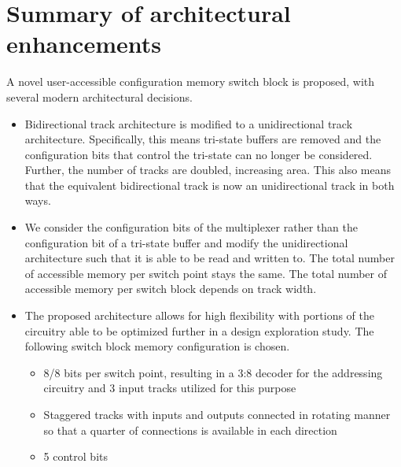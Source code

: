 
\section{Summary of architectural enhancements}
\label{arch:summary}
A novel user-accessible configuration memory switch block is proposed, with several modern architectural decisions. 


\begin{itemize}
    \item Bidirectional track architecture is modified to a unidirectional track architecture. Specifically, this means tri-state buffers are removed and the configuration bits that control the tri-state can no longer be considered. Further, the number of tracks are doubled, increasing area. This also means that the equivalent bidirectional track is now an unidirectional track in both ways. 
    \item We consider the configuration bits of the multiplexer rather than the configuration bit of a tri-state buffer and modify the unidirectional architecture such that it is able to be read and written to. The total number of accessible memory per switch point stays the same. The total number of accessible memory per switch block depends on track width.
    \item 
    
The proposed architecture allows for high flexibility with portions of the circuitry able to be optimized further in a design exploration study. The following switch block memory configuration is chosen.

\begin{itemize}
    \item 8/8 bits per switch point, resulting in a 3:8 decoder for the addressing circuitry and 3 input tracks utilized for this purpose
    \item Staggered tracks with inputs and outputs connected in rotating manner so that a quarter of connections is available in each direction
    \item 5 control bits
    
\end{itemize}
\end{itemize}

